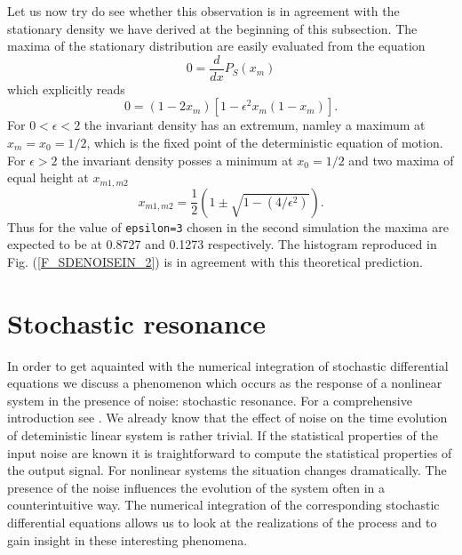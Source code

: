 Let us now try do see whether this observation is in agreement 
with the stationary density we have derived at the beginning of 
this subsection. The maxima of the stationary distribution are 
easily evaluated from the equation
\begin{equation*}
0 = \frac{d}{dx}P_S(x_m)
\end{equation*}
which explicitly reads
\begin{equation*}
0= (1-2x_m) [1- \epsilon^2 x_m (1-x_m) ].
\end{equation*}
For $0 < \epsilon <2$ the invariant density has an extremum, 
namley a maximum at $x_m =x_0= 1/2$, which is the fixed point of the 
deterministic equation of motion. For $\epsilon > 2$ the invariant
density posses a minimum at $x_0 =1/2$ and two maxima of equal 
height at $x_{m1,m2}$
\begin{equation*}
x_{m1,m2} = \frac{1}{2} \left(1 \pm  \sqrt{1 - (4/\epsilon^2)} 
\right).
\end{equation*}
Thus for the value of \texttt{epsilon=3} chosen in the second 
simulation the maxima are expected  to be at 0.8727 and 0.1273 
respectively. The histogram reproduced in Fig. (\ref{F_SDENOISEIN_2})
is in agreement with this theoretical prediction.


\section{Stochastic resonance}
In order to get aquainted with 
the numerical integration of stochastic differential equations we discuss a
phenomenon which occurs as
the response of a nonlinear system in the presence of noise: stochastic 
resonance. For a comprehensive introduction see \cite{Lanzara,Bulsara}. 
We already know that the effect of noise on the time evolution of 
deteministic linear system is rather trivial. If the statistical properties of
the input noise are known it is traightforward to compute the statistical
properties of the output signal. For nonlinear systems the situation changes
dramatically. The presence of the noise influences the evolution of the
system often in a counterintuitive way. The numerical integration of the
corresponding stochastic differential equations allows us to look at the
realizations of the process and to gain insight in these interesting
phenomena. 

